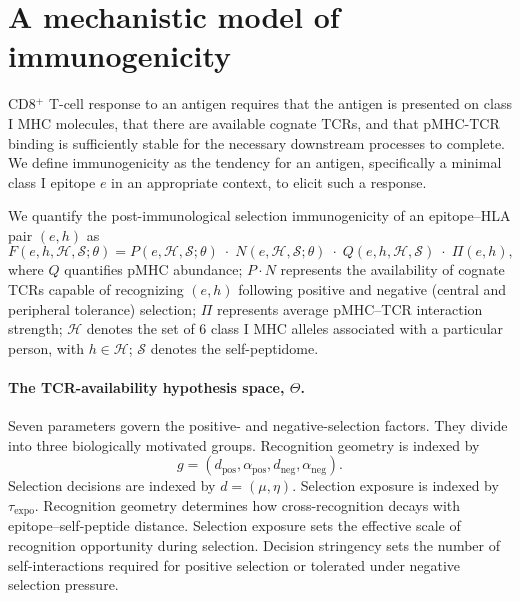 \documentclass[11pt]{article}
\begin{document}
\fi





\section{A mechanistic model of immunogenicity}
CD8$^{+}$ T-cell response to an antigen requires that the antigen is presented on class I MHC molecules, that there are available cognate TCRs, and that pMHC-TCR binding is sufficiently stable for the necessary downstream processes to complete. We define immunogenicity as the tendency for an antigen, specifically a minimal class I epitope $e$ in an appropriate context, to elicit such a response.

We quantify the post-immunological selection immunogenicity of an epitope--HLA pair $(e,h)$ as
\begin{equation}
F(e,h,\mathcal{H},\mathcal{S};\theta)
= P(e,\mathcal{H},\mathcal{S};\theta)\;\cdot\;N(e,\mathcal{H},\mathcal{S};\theta)\;\cdot\;Q(e,h,\mathcal{H},\mathcal{S})
\;\cdot\;\Pi(e,h),
\label{eq:F_full}
\end{equation}
where $Q$ quantifies pMHC abundance;
$P \cdot N$ represents the availability of cognate TCRs capable of recognizing $(e,h)$ following positive and negative (central and peripheral tolerance) selection; $\Pi$ represents
average pMHC--TCR interaction strength; $\mathcal{H}$ denotes the set of 6 class I MHC alleles associated with a particular person, with $h \in \mathcal{H}$; $\mathcal{S}$ denotes the self-peptidome.


\paragraph{The TCR-availability hypothesis space, $\Theta$.}
Seven parameters govern the positive- and negative-selection factors. They
divide into three biologically
motivated groups. Recognition geometry is indexed by
\[
g=(d_{\mathrm{pos}},\alpha_{\mathrm{pos}},
d_{\mathrm{neg}},\alpha_{\mathrm{neg}}).
\]
Selection decisions are indexed by
$d=(\mu,\eta)$. Selection exposure is indexed by $\tau_{\mathrm{expo}}$.
Recognition geometry determines how cross-recognition decays with
epitope--self-peptide distance. Selection exposure sets the effective
scale of recognition opportunity during selection. Decision stringency
sets the number of self-interactions required for positive selection
or tolerated under negative selection pressure.
\end{document}
